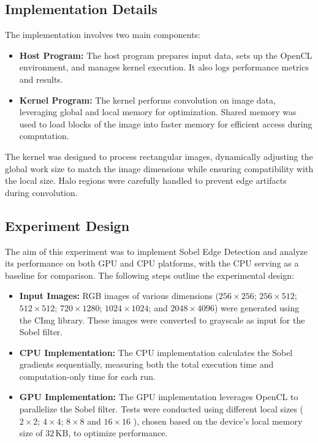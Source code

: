 \documentclass{article}
\begin{document}
\subsection*{Implementation Details}

The implementation involves two main components:
\begin{itemize}
    \item \textbf{Host Program:} The host program prepares input data, sets up the OpenCL environment, 
    and manages kernel execution. It also logs performance metrics and results.
    \item \textbf{Kernel Program:} The kernel performs convolution on image data, leveraging
     global and local memory for optimization. Shared memory was used to load blocks 
     of the image into faster memory for efficient access during computation.
\end{itemize}

The kernel was designed to process rectangular images, dynamically adjusting the 
global work size to match the image dimensions while ensuring compatibility with the local size. Halo regions 
were carefully handled to prevent edge artifacts during convolution.


\subsection*{Experiment Design}

The aim of this experiment was to implement Sobel Edge Detection and analyze its performance on both GPU and CPU platforms, with the CPU serving as a baseline for comparison. The following steps outline the experimental design:

\begin{itemize}
    \item \textbf{Input Images:} RGB images of various dimensions (\(256\times256\); \(256\times512\); \(512\times512\); 
    \(720\times1280\); \(1024\times1024\); and \(2048\times4096\)) were generated using the CImg library. These images were converted to grayscale as input for the Sobel filter.
    \item \textbf{CPU Implementation:} The CPU implementation calculates the Sobel gradients sequentially, 
    measuring both the total execution time and computation-only time for each run.
    \item \textbf{GPU Implementation:} The GPU implementation leverages OpenCL to parallelize the Sobel filter. 
    Tests were conducted using different local sizes (\(2 \times 2\); \(4 \times 4\); \(8\times 8\) and \(16 \times 16\) ), 
    chosen based on the device’s local memory size of \(32\,\mathrm{KB}\), to optimize performance.
\end{itemize}
\end{document}
